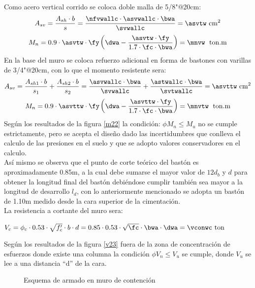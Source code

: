 Como acero vertical corrido se coloca doble malla de 5/8"@20cm:
\FPset{}
\FPset{}
\FPset{}
\FPeval{}
$$
A_{sv}=\frac{A_{sh}\cdot b}{s}=\frac{\nfvwallc\cdot\asvwallc\cdot\bwa}{\svwallc}=\asvtw\mathrm{~cm^2}$$
$$
M_{n}=0.9\cdot \asvtw \cdot \fy\left ( \dwa-\frac{\asvtw\cdot \fy}{1.7\cdot\fc \cdot \bwa} \right )=\mnvw\;\mathrm{~ton.m} 
$$
En la base del muro se coloca refuerzo adicional en forma de bastones con varillas de 3/4"@20cm, con lo que el momento resistente sera:
\FPset{}
\FPset{}
\FPeval{}
$$
A_{sv}=\frac{A_{sh1}\cdot b}{s_{1}}+\frac{A_{sh2}\cdot b}{s_{2}}=\frac{\asvwallc\cdot\bwa}{\svwallc}+\frac{\astwallc\cdot\bwa}{\svtwallc}=\asvttw\mathrm{~cm^2}$$
$$
M_{n}=0.9\cdot \asvttw \cdot \fy\left ( \dwa-\frac{\asvttw\cdot \fy}{1.7\cdot\fc \cdot \bwa} \right )=\mnvtw\;\mathrm{~ton.m} 
$$
Según los resultados de la figura \ref{m22} la condición: $\phi M_{n}\leq M_{u}$ no se cumple estrictamente, pero se acepta el diseño dado las incertidumbres que conlleva el calculo de las presiones en el suelo y que se adopto valores conservadores en el calculo.\\
Así mismo se observa que el punto de corte teórico del bastón es aproximadamente 0.85m, a la cual debe sumarse el mayor valor de $12d_{b}$ y $d$ para obtener la longitud final del bastón debiéndose cumplir también sea mayor a la longitud de desarrollo $l_{d}$, con lo anteriormente mencionado se adopta un bastón de 1.10m medido desde la cara superior de la cimentación.\\
La resistencia a cortante del muro sera:
\begin{center}
$V_{c}=\phi_{c}\cdot0.53\cdot\sqrt{f_{c}^{\prime}}\cdot b\cdot d=0.85\cdot0.53\cdot\sqrt{\fc}\cdot\bwa\cdot\dwa=\vconwc\mathrm{~ton}$
\end{center}
Según los resultados de la figura \ref{v23} fuera de la zona de concentración de esfuerzos donde existe una columna la condición $\phi V_{n}\leq V_{u}$ se cumple, donde $V_{u}$ se lee a una distancia ``d'' de la cara.
\begin{figure}[h!]
    \caption{Esquema de armado en muro de contención}
    \centering
    
    \label{fig:my_label}
\end{figure}